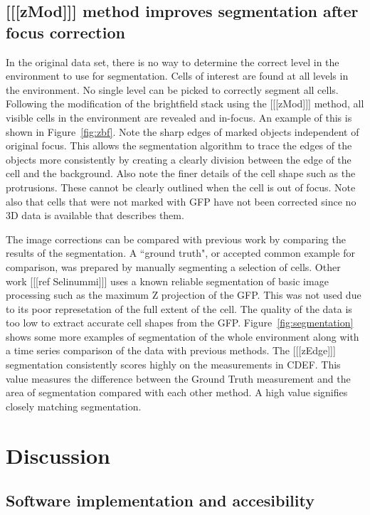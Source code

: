 \documentclass[preprint,11pt,5p,twocolumn]{elsarticle}
\begin{document}
\subsection{[[[zMod]]] method improves segmentation after focus correction}

In the original data set, there is no way to determine the correct level in the environment to use for segmentation. Cells of interest are found at all levels in the environment. No single level can be picked to correctly segment all cells. Following the modification of the brightfield stack using the [[[zMod]]] method, all visible cells in the environment are revealed and in-focus. An example of this is shown in Figure~\ref{fig:zbf}. Note the sharp edges of marked objects independent of original focus. This allows the segmentation algorithm to trace the edges of the objects more consistently by creating a clearly division between the edge of the cell and the background. Also note the finer details of the cell shape such as the protrusions. These cannot be clearly outlined when the cell is out of focus. Note also that cells that were not marked with GFP have not been corrected since no 3D data is available that describes them.

The image corrections can be compared with previous work by comparing the results of the segmentation. A ``ground truth", or accepted common example for comparison, was prepared by manually segmenting a selection of cells. Other work [[[ref Selinummi]]] uses a known reliable segmentation of basic image processing such as the maximum Z projection of the GFP. This was not used due to its poor represetation of the full extent of the cell. The quality of the data is too low to extract accurate cell shapes from the GFP. Figure~\ref{fig:segmentation} shows some more examples of segmentation of the whole environment along with a time series comparison of the data with previous methods. The [[[zEdge]]] segmentation consistently scores highly on the measurements in CDEF. This value measures the difference between the Ground Truth measurement and the area of segmentation compared with each other method. A high value signifies closely matching segmentation.

\section{Discussion}

\subsection{Software implementation and accesibility}
\end{document}
